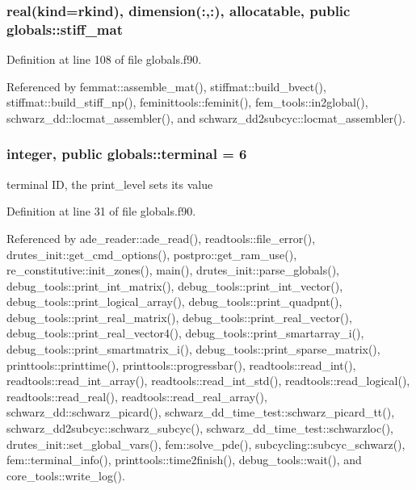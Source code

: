 \subsubsection[{stiff\+\_\+mat}]{\setlength{\rightskip}{0pt plus 5cm}real(kind=rkind), dimension(\+:,\+:), allocatable, public globals\+::stiff\+\_\+mat}\label{namespaceglobals_a3fbc98376e8fe4a4597adda7583a86f6}


Definition at line 108 of file globals.\+f90.



Referenced by femmat\+::assemble\+\_\+mat(), stiffmat\+::build\+\_\+bvect(), stiffmat\+::build\+\_\+stiff\+\_\+np(), feminittools\+::feminit(), fem\+\_\+tools\+::in2global(), schwarz\+\_\+dd\+::locmat\+\_\+assembler(), and schwarz\+\_\+dd2subcyc\+::locmat\+\_\+assembler().

\subsubsection[{terminal}]{\setlength{\rightskip}{0pt plus 5cm}integer, public globals\+::terminal = 6}\label{namespaceglobals_aee7d7e51108301fe95e24ec0d8e3a437}


terminal ID, the print\+\_\+level sets its value 



Definition at line 31 of file globals.\+f90.



Referenced by ade\+\_\+reader\+::ade\+\_\+read(), readtools\+::file\+\_\+error(), drutes\+\_\+init\+::get\+\_\+cmd\+\_\+options(), postpro\+::get\+\_\+ram\+\_\+use(), re\+\_\+constitutive\+::init\+\_\+zones(), main(), drutes\+\_\+init\+::parse\+\_\+globals(), debug\+\_\+tools\+::print\+\_\+int\+\_\+matrix(), debug\+\_\+tools\+::print\+\_\+int\+\_\+vector(), debug\+\_\+tools\+::print\+\_\+logical\+\_\+array(), debug\+\_\+tools\+::print\+\_\+quadpnt(), debug\+\_\+tools\+::print\+\_\+real\+\_\+matrix(), debug\+\_\+tools\+::print\+\_\+real\+\_\+vector(), debug\+\_\+tools\+::print\+\_\+real\+\_\+vector4(), debug\+\_\+tools\+::print\+\_\+smartarray\+\_\+i(), debug\+\_\+tools\+::print\+\_\+smartmatrix\+\_\+i(), debug\+\_\+tools\+::print\+\_\+sparse\+\_\+matrix(), printtools\+::printtime(), printtools\+::progressbar(), readtools\+::read\+\_\+int(), readtools\+::read\+\_\+int\+\_\+array(), readtools\+::read\+\_\+int\+\_\+std(), readtools\+::read\+\_\+logical(), readtools\+::read\+\_\+real(), readtools\+::read\+\_\+real\+\_\+array(), schwarz\+\_\+dd\+::schwarz\+\_\+picard(), schwarz\+\_\+dd\+\_\+time\+\_\+test\+::schwarz\+\_\+picard\+\_\+tt(), schwarz\+\_\+dd2subcyc\+::schwarz\+\_\+subcyc(), schwarz\+\_\+dd\+\_\+time\+\_\+test\+::schwarzloc(), drutes\+\_\+init\+::set\+\_\+global\+\_\+vars(), fem\+::solve\+\_\+pde(), subcycling\+::subcyc\+\_\+schwarz(), fem\+::terminal\+\_\+info(), printtools\+::time2finish(), debug\+\_\+tools\+::wait(), and core\+\_\+tools\+::write\+\_\+log().



